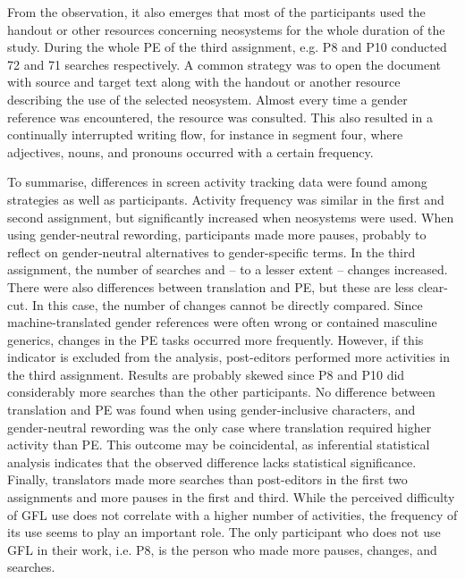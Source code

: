 From the observation, it also emerges that most of the participants used the handout or other resources concerning neosystems for the whole duration of the study. During the whole PE of the third assignment, e.g. P8 and P10 conducted 72 and 71 searches respectively. A common strategy was to open the document with source and target text along with the handout or another resource describing the use of the selected neosystem. Almost every time a gender reference was encountered, the resource was consulted. This also resulted in a continually interrupted writing flow, for instance in segment four, where adjectives, nouns, and pronouns occurred with a certain frequency.

To summarise, differences in screen activity tracking data were found among strategies as well as participants. Activity frequency was similar in the first and second assignment, but significantly increased when neosystems were used. When using gender-neutral rewording, participants made more pauses, probably to reflect on gender-neutral alternatives to gender-specific terms. In the third assignment, the number of searches and -- to a lesser extent -- changes increased. There were also differences between translation and PE, but these are less clear-cut. In this case, the number of changes cannot be directly compared. Since machine-translated gender references were often wrong or contained masculine generics, changes in the PE tasks occurred more frequently. However, if this indicator is excluded from the analysis, post-editors performed more activities in the third assignment. Results are probably skewed since P8 and P10 did considerably more searches than the other participants. No difference between translation and PE was found when using gender-inclusive characters, and gender-neutral rewording was the only case where translation required higher activity than PE. This outcome may be coincidental, as inferential statistical analysis indicates that the observed difference lacks statistical significance. Finally, translators made more searches than post-editors in the first two assignments and more pauses in the first and third. While the perceived difficulty of GFL use does not correlate with a higher number of activities, the frequency of its use seems to play an important role. The only participant who does not use GFL in their work, i.e. P8, is the person who made more pauses, changes, and searches.

